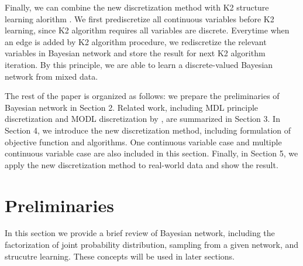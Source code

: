 Finally, we can combine the new discretization method with K2 structure learning alorithm \citep{K2}. We first prediscretize all continuous variables before K2 learning, since K2 algorithm requires all variables are discrete. Everytime when an edge is added by K2 algorithm procedure, we rediscretize the relevant variables in Bayesian network and store the result for next K2 algorithm iteration. By this principle, we are able to learn a discrete-valued Bayesian network from mixed data.

The rest of the paper is organized as follows: we prepare the preliminaries of Bayesian network in Section 2. Related work, including MDL principle discretization \citep{Friedman_1996} and MODL discretization by \citet{Boulle_2006}, are summarized in Section 3. In Section 4, we introduce the new discretization method, including formulation of objective function and algorithms. One continuous variable case and multiple continuous variable case are also included in this section. Finally, in Section 5, we apply the new discretization method to real-world data and show the result.

\section{Preliminaries}
In this section we provide a brief review of Bayesian network, including the factorization of joint probability distribution, sampling from a given network, and strucutre learning. These concepts will be used in later sections.
\label{Prelim}
